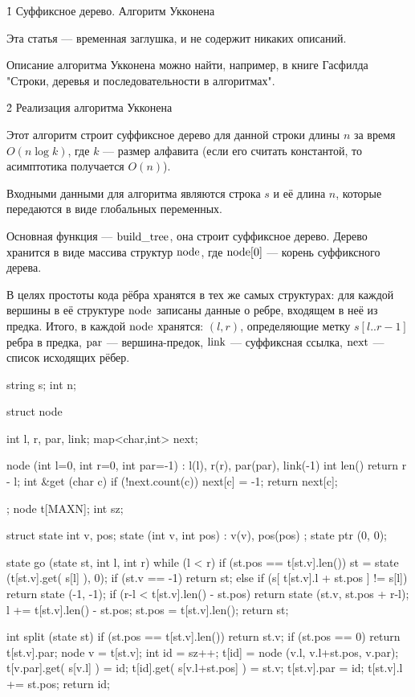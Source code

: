 \h1{ Суффиксное дерево. Алгоритм Укконена }

Эта статья --- временная заглушка, и не содержит никаких описаний.

Описание алгоритма Укконена можно найти, например, в книге Гасфилда "Строки, деревья и последовательности в алгоритмах".


\h2{ Реализация алгоритма Укконена }

Этот алгоритм строит суффиксное дерево для данной строки длины $n$ за время $O (n \log k)$, где $k$ --- размер алфавита (если его считать константой, то асимптотика получается $O (n)$).

Входными данными для алгоритма являются строка $s$ и её длина $n$, которые передаются в виде глобальных переменных.

Основная функция --- $\rm build\_tree$, она строит суффиксное дерево. Дерево хранится в виде массива структур $\rm node$, где ${\rm node}[0]$ --- корень суффиксного дерева.

В целях простоты кода рёбра хранятся в тех же самых структурах: для каждой вершины в её структуре $\rm node$ записаны данные о ребре, входящем в неё из предка. Итого, в каждой $\rm node$ хранятся: $(l,r)$, определяющие метку $s[l..r-1]$ ребра в предка, $\rm par$ --- вершина-предок, $\rm link$ --- суффиксная ссылка, $\rm next$ --- список исходящих рёбер.

\code
string s;
int n;

struct node {
	int l, r, par, link;
	map<char,int> next;

	node (int l=0, int r=0, int par=-1)
		: l(l), r(r), par(par), link(-1) {}
	int len()  {  return r - l;  }
	int &get (char c) {
		if (!next.count(c))  next[c] = -1;
		return next[c];
	}
};
node t[MAXN];
int sz;

struct state {
	int v, pos;
	state (int v, int pos) : v(v), pos(pos)  {}
};
state ptr (0, 0);

state go (state st, int l, int r) {
	while (l < r)
		if (st.pos == t[st.v].len()) {
			st = state (t[st.v].get( s[l] ), 0);
			if (st.v == -1)  return st;
		}
		else {
			if (s[ t[st.v].l + st.pos ] != s[l])
				return state (-1, -1);
			if (r-l < t[st.v].len() - st.pos)
				return state (st.v, st.pos + r-l);
			l += t[st.v].len() - st.pos;
			st.pos = t[st.v].len();
		}
	return st;
}

int split (state st) {
	if (st.pos == t[st.v].len())
		return st.v;
	if (st.pos == 0)
		return t[st.v].par;
	node v = t[st.v];
	int id = sz++;
	t[id] = node (v.l, v.l+st.pos, v.par);
	t[v.par].get( s[v.l] ) = id;
	t[id].get( s[v.l+st.pos] ) = st.v;
	t[st.v].par = id;
	t[st.v].l += st.pos;
	return id;
}

